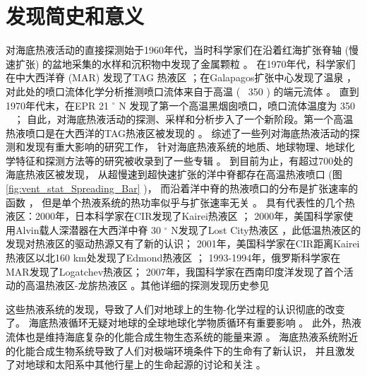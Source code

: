 \section{发现简史和意义}  %
对海底热液活动的直接探测始于1960年代，当时科学家们在沿着红海扩张脊轴 (慢速扩张) 的盆地采集的水样和沉积物中发现了金属颗粒  \citep{miller1964highest,miller1966hot,degens2013hot} 。
在1970年代，科学家们在中大西洋脊 (MAR) 发现了TAG 热液区  \citep{rona1975anomalous} ；在Galapagos扩张中心发现了温泉  \citep{corliss1979submarine} ，
对此处的喷口流体化学分析推测喷口流体来自于高温 (~ 350 \ssd) 的端元流体  \citep{edmond1979ridge}  。
直到1970年代末，在EPR 21  $ ^{\circ}  $  N 发现了第一个高温黑烟囱喷口，喷口流体温度为 350 \ssd \   \citep{spiess1980east} ；
自此，对海底热液活动的探测、采样和分析步入了一个新阶段。第一个高温热液喷口是在大西洋的TAG热液区被发现的  \cite{rona1986black} 。
 \cite{rona1980seafloor} 综述了一些列对海底热液活动的探测和发现有重大影响的研究工作，
针对海底热液系统的地质、地球物理、地球化学特征和探测方法等的研究被收录到了一些专辑 \citep{rona1983hydrothermal,wilcock2004subseafloor,german2004mid,lowell2008magma,rona2010diversity}  。
到目前为止，有超过700处的海底热液区被发现，
从超慢速到超快速扩张的洋中脊都存在高温热液喷口 (图 \ref{fig:vent_stat_Spreading_Bar} )，
而沿着洋中脊的热液喷口的分布是扩张速率的函数  \citep{baker2004global} ，
但是单个热液系统的热功率似乎与扩张速率无关  \citep{lowell2013characteristics} 。
具有代表性的几个热液区：2000年，日本科学家在CIR发现了Kairei热液区  \citep{gamo2001chemical}  ； 
2000年，美国科学家使用Alvin载人深潜器在大西洋中脊 30  $ ^{\circ}  $  N发现了Lost City热液区  \citep{kelley2001off} ，此低温热液区的发现对热液区的驱动热源又有了新的认识；
2001年，美国科学家在CIR距离Kairei热液区以北160 km处发现了Edmond热液区  \citep{von2001edmond} ；
1993-1994年，俄罗斯科学家在MAR发现了Logatchev热液区；
2007年，我国科学家在西南印度洋发现了首个活动的高温热液区-龙旂热液区  \citep{tao2012first}  。其他详细的探测发现历史参见  \cite{曾志刚2011海底热液地质学} 


这些热液系统的发现，导致了人们对地球上的生物-化学过程的认识彻底的改变了。
海底热液循环无疑对地球的全球地球化学物质循环有重要影响  \cite{edmond1979ridge} 。
此外，热液流体也是维持海底复杂的化能合成生物生态系统的能量来源  \cite{jannasch1995microbial} 。
海底热液系统附近的化能合成生物系统导致了人们对极端环境条件下的生命有了新认识，
并且激发了对地球和太阳系中其他行星上的生命起源的讨论和关注  \citep{baross1985submarine,nisbet2001habitat,mccollom1999methanogenesis,westall2013habitability} 。



